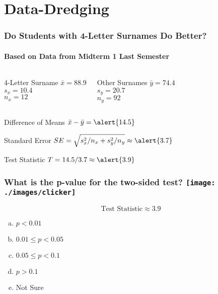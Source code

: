 \section{Data-Dredging}
\begin{frame}[c]\frametitle{Do Students with 4-Letter Surnames Do Better?}
 \framesubtitle{Based on Data from Midterm 1 Last Semester}
    \begin{columns}
    	 \begin{block}
    		{4-Letter Surname}
    			$\bar{x} = 88.9$\\
    			$s_x = 10.4$\\
    			$n_x = 12$
    	\end{block} 
    	 \begin{block}
    		{Other Surnames}
    			$\bar{y} = 74.4$\\
    			$s_y = 20.7$\\
    			$n_y = 92$
    	\end{block}
    \end{columns}

\vspace{1em}
\begin{block}
	{Difference of Means}
	$\bar{x} - \bar{y} = \alert{14.5}$
\end{block}
\begin{block}
	{Standard Error}
	$\displaystyle SE = \sqrt{s_x^2/n_x + s_y^2/n_y} \approx \alert{3.7}$
\end{block}
\begin{block}
	{Test Statistic}
	$T = 14.5 / 3.7 \approx \alert{3.9}$
\end{block}
\end{frame}
\begin{frame}[c]\frametitle{What is the p-value for the two-sided test?  \hfill \texttt{[image: ./images/clicker]}}
    
$$\boxed{\mbox{Test Statistic} \approx 3.9}$$

\begin{enumerate}[(a)]
	\item $p < 0.01$
	\item $0.01 \leq p < 0.05$
	\item $0.05 \leq p < 0.1$
	\item $p > 0.1$
	\item Not Sure
\end{enumerate}
\end{frame}
